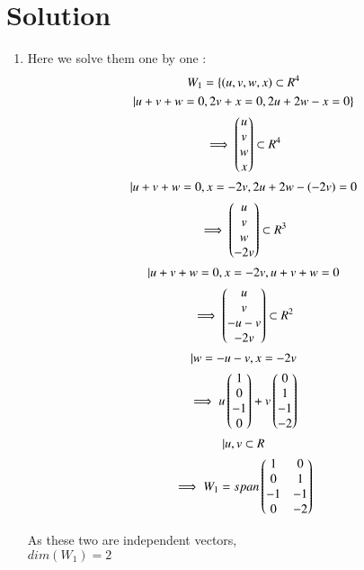 \section{Solution}
\begin{enumerate}
    \item Here we solve them one by one :
\begin{multline}
    W_{1}=\{(u,v,w,x)\subset R^{4} \\ | u+v+w=0,2v+x=0,2u+2w-x=0\}
\\
    \implies \begin{pmatrix}u\\v\\w\\x\end{pmatrix}\subset R^{4} \\ | u+v+w=0,x=-2v,2u+2w-(-2v)=0
\\
    \implies  \begin{pmatrix}u\\v\\w\\-2v\end{pmatrix}\subset R^{3} \\ | u+v+w=0,x=-2v,u+v+w=0
\\
    \implies \begin{pmatrix}u\\v\\-u-v\\-2v\end{pmatrix}\subset R^{2} \\ | w=-u-v,x=-2v
\\
    \implies u\begin{pmatrix}1\\0\\-1\\0\end{pmatrix}+v\begin{pmatrix}0\\1\\-1\\-2\end{pmatrix} \\ | u,v \subset R
\\
    \implies W_{1}= span\begin{pmatrix}1&0\\0&1\\-1&-1\\0&-2\end{pmatrix}
\end{multline}

As these two are independent vectors,\\ 
$dim(W_{1})=2$


\end{enumerate}
